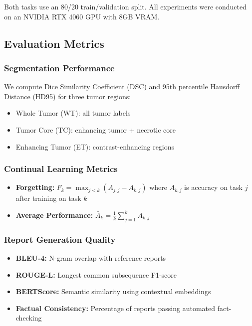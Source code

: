 \documentclass[conference]{IEEEtran}
\begin{document}
Both tasks use an 80/20 train/validation split. All experiments were conducted on an NVIDIA RTX 4060 GPU with 8GB VRAM.

\subsection{Evaluation Metrics}

\subsubsection{Segmentation Performance}

We compute Dice Similarity Coefficient (DSC) and 95th percentile Hausdorff Distance (HD95) for three tumor regions:
\begin{itemize}
\item Whole Tumor (WT): all tumor labels
\item Tumor Core (TC): enhancing tumor + necrotic core
\item Enhancing Tumor (ET): contrast-enhancing regions
\end{itemize}

\subsubsection{Continual Learning Metrics}

\begin{itemize}
\item \textbf{Forgetting:} $F_k = \max_{j < k} (A_{j,j} - A_{k,j})$ where $A_{k,j}$ is accuracy on task $j$ after training on task $k$
\item \textbf{Average Performance:} $\bar{A}_k = \frac{1}{k} \sum_{j=1}^k A_{k,j}$
\end{itemize}

\subsubsection{Report Generation Quality}

\begin{itemize}
\item \textbf{BLEU-4:} N-gram overlap with reference reports
\item \textbf{ROUGE-L:} Longest common subsequence F1-score
\item \textbf{BERTScore:} Semantic similarity using contextual embeddings
\item \textbf{Factual Consistency:} Percentage of reports passing automated fact-checking
\end{itemize}
\end{document}
